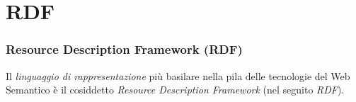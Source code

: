 \documentclass[8pt]{beamer}
\begin{document}
\section{RDF}

\begin{frame}
 \frametitle{Resource Description Framework (RDF)}
 Il \emph{linguaggio di rappresentazione} pi\`u basilare nella pila
 delle tecnologie del Web Semantico \`e il cosiddetto 
 \emph{Resource Description Framework} (nel seguito \emph{RDF}).
 
\end{frame}

\newcommand{\RDFv}{\mathtt{RDF}}
\end{document}
